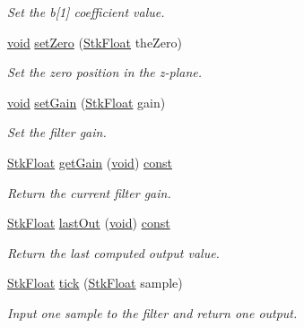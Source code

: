 \begin{DoxyCompactItemize}
\begin{DoxyCompactList}\small\item\em Set the b\mbox{[}1\mbox{]} coefficient value. \end{DoxyCompactList}\item 
\hyperlink{sound_8c_ae35f5844602719cf66324f4de2a658b3}{void} \hyperlink{class_nyq_1_1_one_zero_a7eda2950599b2ad5737278bdf1a90c59}{set\+Zero} (\hyperlink{namespace_nyq_a044fa20a706520a617bbbf458a7db7e4}{Stk\+Float} the\+Zero)
\begin{DoxyCompactList}\small\item\em Set the zero position in the z-\/plane. \end{DoxyCompactList}\item 
\hyperlink{sound_8c_ae35f5844602719cf66324f4de2a658b3}{void} \hyperlink{class_nyq_1_1_one_zero_a80d4c286a4642c83064dc0c49d358188}{set\+Gain} (\hyperlink{namespace_nyq_a044fa20a706520a617bbbf458a7db7e4}{Stk\+Float} gain)
\begin{DoxyCompactList}\small\item\em Set the filter gain. \end{DoxyCompactList}\item 
\hyperlink{namespace_nyq_a044fa20a706520a617bbbf458a7db7e4}{Stk\+Float} \hyperlink{class_nyq_1_1_one_zero_a6fec1965f18d7d69687bf3df1e2bf521}{get\+Gain} (\hyperlink{sound_8c_ae35f5844602719cf66324f4de2a658b3}{void}) \hyperlink{getopt1_8c_a2c212835823e3c54a8ab6d95c652660e}{const} 
\begin{DoxyCompactList}\small\item\em Return the current filter gain. \end{DoxyCompactList}\item 
\hyperlink{namespace_nyq_a044fa20a706520a617bbbf458a7db7e4}{Stk\+Float} \hyperlink{class_nyq_1_1_one_zero_a51475280c60d6e6cb194a08f39d76be5}{last\+Out} (\hyperlink{sound_8c_ae35f5844602719cf66324f4de2a658b3}{void}) \hyperlink{getopt1_8c_a2c212835823e3c54a8ab6d95c652660e}{const} 
\begin{DoxyCompactList}\small\item\em Return the last computed output value. \end{DoxyCompactList}\item 
\hyperlink{namespace_nyq_a044fa20a706520a617bbbf458a7db7e4}{Stk\+Float} \hyperlink{class_nyq_1_1_one_zero_a16d74a83d97e508812d5b29e30166deb}{tick} (\hyperlink{namespace_nyq_a044fa20a706520a617bbbf458a7db7e4}{Stk\+Float} sample)
\begin{DoxyCompactList}\small\item\em Input one sample to the filter and return one output. \end{DoxyCompactList}\item 

\end{DoxyCompactItemize}
